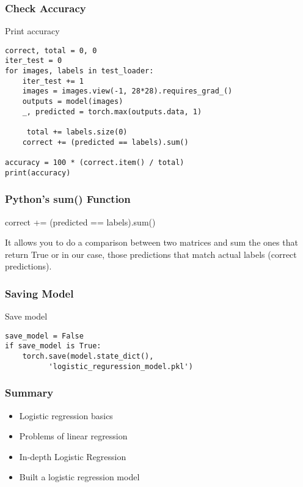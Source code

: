 \documentclass[14 pt]{beamer}
\let\olditem\item
\renewcommand{\item}{\olditem\vspace{4pt}}
\begin{document}
\begin{frame}[fragile]
  \frametitle{Check Accuracy}
\small{
  \begin{block}{Print accuracy}
\begin{verbatim}
correct, total = 0, 0
iter_test = 0
for images, labels in test_loader:
    iter_test += 1
    images = images.view(-1, 28*28).requires_grad_()
    outputs = model(images)
    _, predicted = torch.max(outputs.data, 1)

     total += labels.size(0)
    correct += (predicted == labels).sum()

accuracy = 100 * (correct.item() / total)
print(accuracy)
\end{verbatim}
  \end{block}
}
\end{frame}

\begin{frame}
  \frametitle{Python's \textbf{sum()} Function}
  \begin{block}{}
   correct += (predicted == labels).sum()
  \end{block}

  It allows you to do a comparison between two matrices and sum the ones that
  return True or in our case, those predictions that match actual labels
  (correct predictions).
\end{frame}

\begin{frame}[fragile]
  \frametitle{Saving Model}
  \begin{block}{Save model}
\begin{verbatim}
save_model = False
if save_model is True:
    torch.save(model.state_dict(), 
          'logistic_reguression_model.pkl')
\end{verbatim}
  \end{block}
\end{frame}

\begin{frame}
  \frametitle{Summary}
  \begin{itemize}
  \item Logistic regression basics
  \item Problems of linear regression
  \item In-depth Logistic Regression
  \item Built a logistic regression model 
  \end{itemize}
\end{frame}
\end{document}
